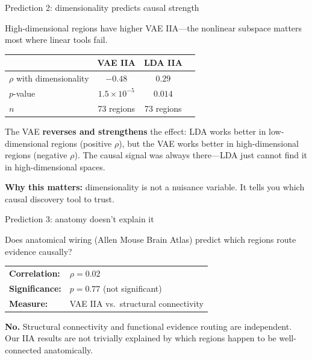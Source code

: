\documentclass[aspectratio=169,11pt]{beamer}
\begin{document}
\begin{frame}{Prediction 2: dimensionality predicts causal strength}

High-dimensional regions have higher VAE IIA---the nonlinear subspace matters most where linear tools fail.

\vspace{0.4em}

\begin{center}
{\small
\begin{tabular}{lccc}
\toprule
& \textbf{VAE IIA} & \textbf{LDA IIA} \\
\midrule
$\rho$ with dimensionality & $-0.48$ & $0.29$ \\
$p$-value & $1.5 \times 10^{-5}$ & $0.014$ \\
$n$ & 73 regions & 73 regions \\
\bottomrule
\end{tabular}
}
\end{center}

\vspace{0.4em}

The VAE \textbf{reverses and strengthens} the effect: LDA works better in low-dimensional regions (positive $\rho$), but the VAE works better in high-dimensional regions (negative $\rho$). The causal signal was always there---LDA just cannot find it in high-dimensional spaces.

\vspace{0.4em}
{\small \textbf{Why this matters:} dimensionality is not a nuisance variable. It tells you which causal discovery tool to trust.}
\end{frame}

\begin{frame}{Prediction 3: anatomy doesn't explain it}

Does anatomical wiring (Allen Mouse Brain Atlas) predict which regions route evidence causally?

\vspace{1em}

\begin{center}
\begin{tabular}{ll}
\textbf{Correlation:} & $\rho = 0.02$ \\[0.3em]
\textbf{Significance:} & $p = 0.77$ (not significant) \\[0.3em]
\textbf{Measure:} & VAE IIA vs.\ structural connectivity \\
\end{tabular}
\end{center}

\vspace{1em}

\textbf{No.} Structural connectivity and functional evidence routing are independent. Our IIA results are not trivially explained by which regions happen to be well-connected anatomically.

\end{frame}
\end{document}
